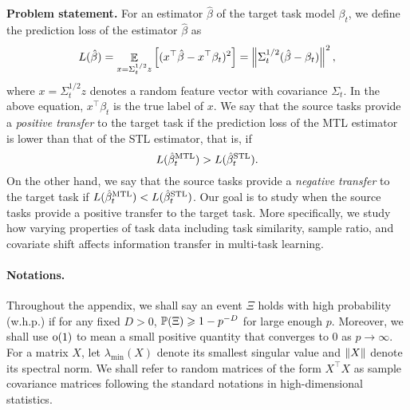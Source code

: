 \medskip
\noindent\textbf{Problem statement.}
For an estimator $\hat{\beta}$ of the target task model $\beta_t$, we define the prediction loss of the estimator $\hat{\beta}$ as
	{\begin{align*}
		\te(\hat{\beta}) = \exarg{x = \Sigma_t^{1/2} z}{({x}^{\top}\hat{\beta} - {x}^{\top}\beta_t)^2}
		= \bignorm{\Sigma_t^{1/2} (\hat{\beta} - \beta_t)}^2,
	\end{align*}}%
where $x = \Sigma_t^{1/2} z$ denotes a random feature vector with covariance $\Sigma_t$.
In the above equation, $x^{\top}\beta_t$ is the true label of $x$.
We say that the source tasks provide a \textit{positive transfer} to the target task if the prediction loss of the MTL estimator is lower than that of the STL estimator, that is, if
	\[ L(\hat{\beta}_t^{\MTL}) > L(\hat{\beta}_t^{\STL}). \]
On the other hand, we say that the source tasks provide a \textit{negative transfer} to the target task if $L(\hat{\beta}_t^{\MTL}) < L(\hat{\beta}_t^{\STL})$.
Our goal is to study when the source tasks provide a positive transfer to the target task.
More specifically, we study how varying properties of task data including task similarity, sample ratio, and covariate shift affects information transfer in multi-task learning.

\paragraph{Notations.}
Throughout the appendix, we shall say an event $\Xi$ holds with high probability (w.h.p.) if for any fixed $D>0$, $\P(\Xi)\ge 1- p^{-D}$ for large enough $p$. Moreover, we shall use $\oo(1)$ to mean a small positive quantity that converges to 0 as $p\to \infty$.
For a matrix $X$, let $\lambda_{\min}(X)$ denote its smallest singular value and $\norm{X}$ denote its spectral norm.
We shall refer to random matrices of the form $X^\top X$ as sample covariance matrices following the standard notations in high-dimensional statistics.






